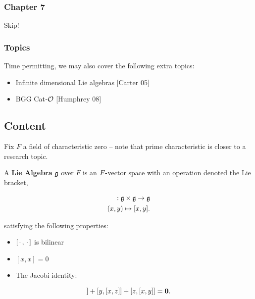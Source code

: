 \hypertarget{chapter-7}{%
\subsubsection{Chapter 7}\label{chapter-7}}

Skip!

\hypertarget{topics}{%
\subsubsection{Topics}\label{topics}}

Time permitting, we may also cover the following extra topics:

\begin{itemize}
\tightlist
\item
  Infinite dimensional Lie algebras {[}Carter 05{]}
\item
  BGG Cat\({\hbox{-}}\mathcal O\) {[}Humphrey 08{]}
\end{itemize}

\hypertarget{content}{%
\subsection{Content}\label{content}}

Fix \(F\) a field of characteristic zero -- note that prime
characteristic is closer to a research topic.


A \textbf{Lie Algebra} \({\mathfrak{g}}\) over \(F\) is an \(F{\hbox{-}}\)vector space
with an operation denoted the Lie bracket,

\begin{align*}
[\wait, \wait]: \lieg \cross \lieg \to \lieg \\
(x,y) \mapsto [x, y]
.\end{align*}

satisfying the following properties:

\begin{itemize}
\tightlist
\item
  \([{\,\cdot\,}, {\,\cdot\,}]\) is bilinear
\item
  \([x, x] = 0\)
\item
  The Jacobi identity:
\end{itemize}

\begin{align*}
[x, [y, z]] + [y, [x,z]] + [z, [x, y]] = \vector 0
.\end{align*}


